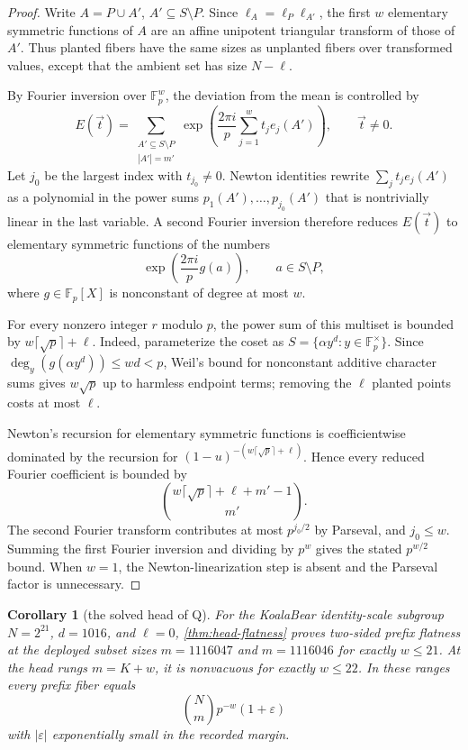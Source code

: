 \documentclass[a4paper,11pt]{amsart}
\newtheorem{corollary}[corollary]{Corollary}
\theoremstyle{remark}
\newcommand{\F}{\mathbb F}
\begin{document}
\begin{proof}
Write \(A=P\cup A'\), \(A'\subseteq S\setminus P\).  Since \(\ell_A=\ell_P\ell_{A'}\), the first \(w\) elementary symmetric functions of \(A\) are an affine unipotent triangular transform of those of \(A'\).  Thus planted fibers have the same sizes as unplanted fibers over transformed values, except that the ambient set has size \(N-\ell\).

By Fourier inversion over \(\F_p^w\), the deviation from the mean is controlled by
\[
        E(\vec t)=
        \sum_{\substack{A'\subseteq S\setminus P\\ |A'|=m'}}
        \exp\left(\frac{2\pi i}{p}\sum_{j=1}^w t_j e_j(A')\right),
        \qquad \vec t\ne0.
\]
Let \(j_0\) be the largest index with \(t_{j_0}\ne0\).  Newton identities rewrite \(\sum_jt_je_j(A')\) as a polynomial in the power sums \(p_1(A'),\ldots,p_{j_0}(A')\) that is nontrivially linear in the last variable.  A second Fourier inversion therefore reduces \(E(\vec t)\) to elementary symmetric functions of the numbers
\[
        \exp\left(\frac{2\pi i}{p}g(a)\right),
        \qquad a\in S\setminus P,
\]
where \(g\in\F_p[X]\) is nonconstant of degree at most \(w\).

For every nonzero integer \(r\) modulo \(p\), the power sum of this multiset is bounded by \(w\lceil\sqrt p\rceil+\ell\).  Indeed, parameterize the coset as \(S=\{\alpha y^d:y\in\F_p^\times\}\).  Since \(\deg_y(g(\alpha y^d))\le wd<p\), Weil's bound for nonconstant additive character sums \cite{Weil48} gives \(w\sqrt p\) up to harmless endpoint terms; removing the \(\ell\) planted points costs at most \(\ell\).

Newton's recursion for elementary symmetric functions is coefficientwise dominated by the recursion for \((1-u)^{-(w\lceil\sqrt p\rceil+\ell)}\).  Hence every reduced Fourier coefficient is bounded by
\[
        \binom{w\lceil\sqrt p\rceil+\ell+m'-1}{m'}.
\]
The second Fourier transform contributes at most \(p^{j_0/2}\) by Parseval, and \(j_0\le w\).  Summing the first Fourier inversion and dividing by \(p^w\) gives the stated \(p^{w/2}\) bound.  When \(w=1\), the Newton-linearization step is absent and the Parseval factor is unnecessary.
\end{proof}

\begin{corollary}[the solved head of Q]\label{cor:head-q}
For the KoalaBear identity-scale subgroup \(N=2^{21}\), \(d=1016\), and \(\ell=0\), \cref{thm:head-flatness} proves two-sided prefix flatness at the deployed subset sizes \(m=1116047\) and \(m=1116046\) for exactly \(w\le21\).  At the head rungs \(m=K+w\), it is nonvacuous for exactly \(w\le22\).  In these ranges every prefix fiber equals
\[
        \binom Nm p^{-w}(1+\varepsilon)
\]
with \(|\varepsilon|\) exponentially small in the recorded margin.
\end{corollary}
\end{document}
